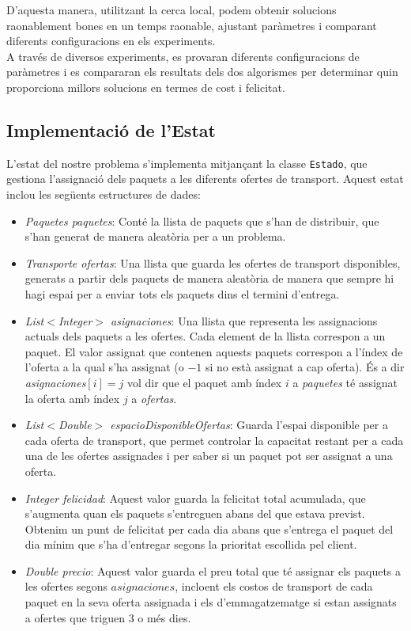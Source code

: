 \documentclass[a4paper]{article}
\begin{document}
	D'aquesta manera, utilitzant la cerca local, podem obtenir solucions raonablement bones en un temps raonable, ajustant paràmetres i comparant diferents configuracions en els experiments. \\
	
	A través de diversos experiments, es provaran diferents configuracions de paràmetres i es compararan els resultats dels dos algorismes per determinar quin proporciona millors solucions en termes de cost i felicitat. \\
	
	\subsection{Implementació de l'Estat}
	
	L'estat del nostre problema s'implementa mitjançant la classe \texttt{Estado}, que gestiona l'assignació dels paquets a les diferents ofertes de transport. Aquest estat inclou les següents estructures de dades:
	
	\begin{itemize}
		\item \emph{Paquetes paquetes}: Conté la llista de paquets que s'han de distribuir, que s'han generat de manera aleatòria per a un problema.
		\item \emph{Transporte ofertas}: Una llista que guarda les ofertes de transport disponibles, generats a partir dels paquets de manera aleatòria de manera que sempre hi hagi espai per a enviar tots els paquets dins el termini d'entrega.
		\item \emph{List$<$Integer$>$ asignaciones}: Una llista que representa les assignacions actuals dels paquets a les ofertes. Cada element de la llista correspon a un paquet. El valor assignat que contenen aquests paquets correspon a l'índex de l'oferta a la qual s'ha assignat (o $-1$ si no està assignat a cap oferta). És a dir \emph{asignaciones$[i] = j$} vol dir que el paquet amb índex $i$ a \textit{paquetes} té assignat la oferta amb índex $j$ a \textit{ofertas}.
		\item \emph{List$<$Double$>$ espacioDisponibleOfertas}: Guarda l'espai disponible per a cada oferta de transport, que permet controlar la capacitat restant per a cada una de les ofertes assignades i per saber si un paquet pot ser assignat a una oferta.
		\item \emph{Integer felicidad}: Aquest valor guarda la felicitat total acumulada, que s'augmenta quan els paquets s'entreguen abans del que estava previst. Obtenim un punt de felicitat per cada dia abans que s'entrega el paquet del dia mínim que s'ha d'entregar segons la prioritat escollida pel client.
		\item \emph{Double precio}: Aquest valor guarda el preu total que té assignar els paquets a les ofertes segons $asignaciones$, incloent els costos de transport de cada paquet en la seva oferta assignada i els d'emmagatzematge si estan assignats a ofertes que triguen $3$ o més dies.
	\end{itemize}
	
\end{document}
